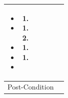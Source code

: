 \documentclass[12pt,a4paper]{report}
\begin{document}
\begin{tabular}{ | m{3cm} | m{12cm}| }
\begin{itemize}
\item
	\begin{enumerate}
		\item 
	\end{enumerate}
\item 
	\begin{enumerate}
	   	 \item	
		\item 
	\end{enumerate}
\item 
	\begin{enumerate}
		\item 
	\end{enumerate}
\item 
	\begin{enumerate}
		\item 
	\end{enumerate}
\item 
\end{itemize}
\\ \hline
Post-Condition &    \\ \hline

\end{tabular}
\end{document}
